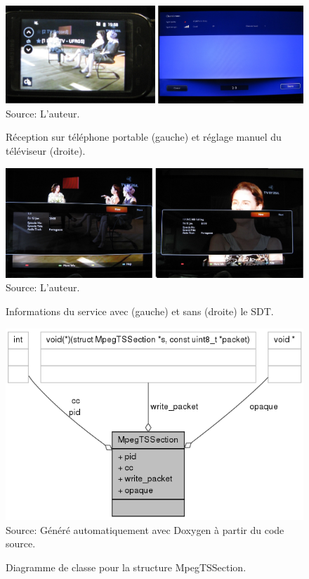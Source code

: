 \documentclass[12pt,a4paper]{article}
\begin{document}
\begin{figure}[!h]
\centering
\caption{Réception sur téléphone portable (gauche) et réglage manuel du téléviseur (droite).}
\includegraphics[width=0.9\linewidth]{pictures/cell_with_sdt.jpg}
\\Source: L'auteur.
\label{fig:cell_with_sdt}
\end{figure}

\begin{figure}[!h]
\centering
\caption{Informations du service avec (gauche) et sans (droite) le SDT.}
\includegraphics[width=0.9\linewidth]{pictures/info_with_without_sdt.jpg}
\\Source: L'auteur.
\label{fig:info_with_without_sdt}
\end{figure}

\newpage
{}
\label{diag_classe}

\begin{figure}[!b]
\centering
\caption{Diagramme de classe pour la structure MpegTSSection.}
\includegraphics[width=0.8\linewidth]{pictures/structMpegTSSection__coll__graph.png}
\\Source: Généré automatiquement avec Doxygen à partir du code source.
\label{fig:structMpegTSSection__coll__graph}
\end{figure}
\end{document}
